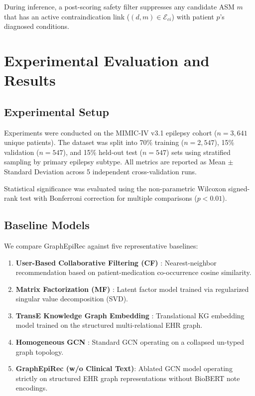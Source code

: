 \documentclass[11pt,a4paper]{article}
\begin{document}
During inference, a post-scoring safety filter suppresses any candidate ASM $m$ that has an active contraindication link ($(d, m) \in \mathcal{E}_{ci}$) with patient $p$'s diagnosed conditions.

\section{Experimental Evaluation and Results}

\subsection{Experimental Setup}
Experiments were conducted on the MIMIC-IV v3.1 epilepsy cohort ($n=3,641$ unique patients). The dataset was split into 70\% training ($n=2,547$), 15\% validation ($n=547$), and 15\% held-out test ($n=547$) sets using stratified sampling by primary epilepsy subtype. All metrics are reported as Mean $\pm$ Standard Deviation across 5 independent cross-validation runs.

Statistical significance was evaluated using the non-parametric Wilcoxon signed-rank test with Bonferroni correction for multiple comparisons ($p < 0.01$).

\subsection{Baseline Models}
We compare GraphEpiRec against five representative baselines:
\begin{enumerate}[leftmargin=*]
    \item \textbf{User-Based Collaborative Filtering (CF)} \cite{koren2009matrix}: Nearest-neighbor recommendation based on patient-medication co-occurrence cosine similarity.
    \item \textbf{Matrix Factorization (MF)} \cite{koren2009matrix}: Latent factor model trained via regularized singular value decomposition (SVD).
    \item \textbf{TransE Knowledge Graph Embedding} \cite{bordes2013translating}: Translational KG embedding model trained on the structured multi-relational EHR graph.
    \item \textbf{Homogeneous GCN} \cite{kipf2017semi}: Standard GCN operating on a collapsed un-typed graph topology.
    \item \textbf{GraphEpiRec (w/o Clinical Text)}: Ablated GCN model operating strictly on structured EHR graph representations without BioBERT note encodings.
\end{enumerate}
\end{document}
